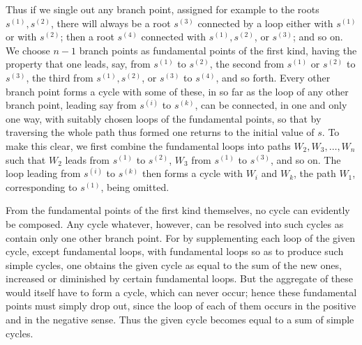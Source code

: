 \documentclass[10pt]{article}
\begin{document}
Thus if we single out any branch point, assigned for example to the roots \(s^{(1)},s^{(2)}\), there will always be a root \(s^{(3)}\) connected by a loop either with \(s^{(1)}\) or with \(s^{(2)}\); then a root \(s^{(4)}\) connected with \(s^{(1)},s^{(2)}\), or \(s^{(3)}\); and so on. We choose \(n-1\) branch points as fundamental points of the first kind, having the property that one leads, say, from \(s^{(1)}\) to \(s^{(2)}\), the second from \(s^{(1)}\) or \(s^{(2)}\) to \(s^{(3)}\), the third from \(s^{(1)},s^{(2)}\), or \(s^{(3)}\) to \(s^{(4)}\), and so forth. Every other branch point forms a cycle with some of these, in so far as the loop of any other branch point, leading say from \(s^{(i)}\) to \(s^{(k)}\), can be connected, in one and only one way, with suitably chosen loops of the fundamental points, so that by traversing the whole path thus formed one returns to the initial value of \(s\). To make this clear, we first combine the fundamental loops into paths \(W_2,W_3,\ldots,W_n\) such that \(W_2\) leads from \(s^{(1)}\) to \(s^{(2)}\), \(W_3\) from \(s^{(1)}\) to \(s^{(3)}\), and so on. The loop leading from \(s^{(i)}\) to \(s^{(k)}\) then forms a cycle with \(W_i\) and \(W_k\), the path \(W_1\), corresponding to \(s^{(1)}\), being omitted.

From the fundamental points of the first kind themselves, no cycle can evidently be composed. Any cycle whatever, however, can be resolved into such cycles as contain only one other branch point. For by supplementing each loop of the given cycle, except fundamental loops, with fundamental loops so as to produce such simple cycles, one obtains the given cycle as equal to the sum of the new ones, increased or diminished by certain fundamental loops. But the aggregate of these would itself have to form a cycle, which can never occur; hence these fundamental points must simply drop out, since the loop of each of them occurs in the positive and in the negative sense. Thus the given cycle becomes equal to a sum of simple cycles.
\end{document}
